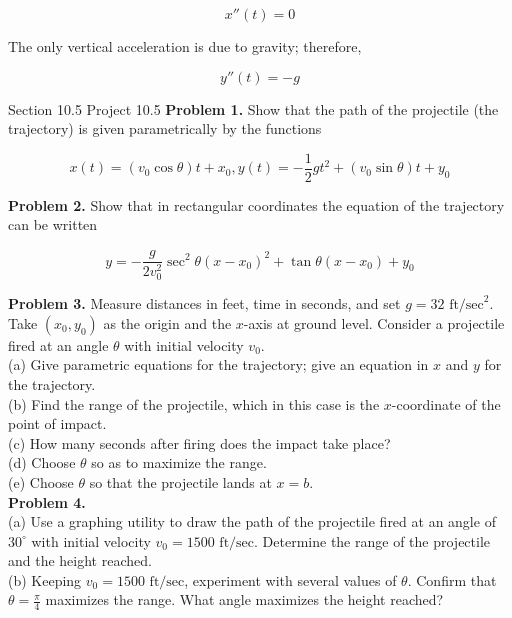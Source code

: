 \documentclass{article}
\begin{document}
    \[
        x''(t) = 0
    \]

    The only vertical acceleration is due to gravity; therefore,

    \[
        y''(t) = -g
    \]

    \begin{tbhtheorem}{Section 10.5 Project 10.5}
        \textbf{Problem 1.} Show that the path of the projectile (the trajectory) is given parametrically by the functions

        \[
            x(t) = \left(v_0 \cos{\theta}\right) t+ x_0, y(t) = -\frac{1}{2}gt^2 + \left(v_0 \sin{\theta}\right) t+ y_0
        \]

        \textbf{Problem 2.} Show that in rectangular coordinates the equation of the trajectory can be written

        \[
            y = -\frac{g}{2v_0^2}\sec^2{\theta}\left(x-x_0\right)^2+ \tan{\theta}\left(x-x_0\right) + y_0
        \]

        \textbf{Problem 3.} Measure distances in feet, time in seconds, and set $g=32 \text{ ft/sec}^2$. Take $\left(x_0,y_0\right)$ as the origin and the $x$-axis at ground level. Consider a projectile fired at an
        angle $\theta$ with initial velocity $v_0$. \\
        (a) Give parametric equations for the trajectory; give an equation in $x$ and $y$ for the trajectory. \\
        (b) Find the range of the projectile, which in this case is the $x$-coordinate of the point of impact. \\
        (c) How many seconds after firing does the impact take place? \\
        (d) Choose $\theta$ so as to maximize the range. \\
        (e) Choose $\theta$ so that the projectile lands at $x=b$. \\

        \textbf{Problem 4.} \\
        (a) Use a graphing utility to draw the path of the projectile fired at an angle of $30^{\circ}$ with initial velocity $v_0 = 1500 \text{ ft/sec}$. Determine the range of the projectile and the height reached. \\
        (b) Keeping $v_0 = 1500\text{ ft/sec}$, experiment with several values of $\theta$. Confirm that $\theta = \frac{\pi}{4}$ maximizes the range. What angle maximizes the height reached?
        \textbf{}
    \end{tbhtheorem}
\end{document}
